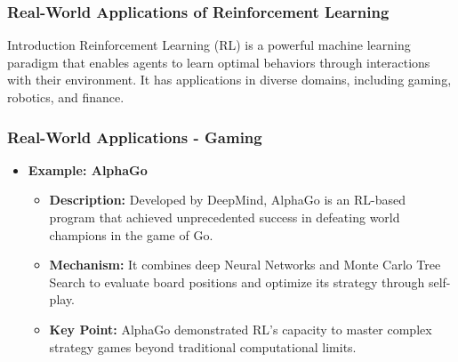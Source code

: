 \documentclass{beamer}
\begin{document}
\begin{frame}[fragile]
    \frametitle{Real-World Applications of Reinforcement Learning}
    \begin{block}{Introduction}
        Reinforcement Learning (RL) is a powerful machine learning paradigm that enables agents to learn optimal behaviors through interactions with their environment. It has applications in diverse domains, including gaming, robotics, and finance.
    \end{block}
\end{frame}

\begin{frame}[fragile]
    \frametitle{Real-World Applications - Gaming}
    \begin{itemize}
        \item \textbf{Example: AlphaGo}
        \begin{itemize}
            \item \textbf{Description:} Developed by DeepMind, AlphaGo is an RL-based program that achieved unprecedented success in defeating world champions in the game of Go.
            \item \textbf{Mechanism:} It combines deep Neural Networks and Monte Carlo Tree Search to evaluate board positions and optimize its strategy through self-play.
            \item \textbf{Key Point:} AlphaGo demonstrated RL's capacity to master complex strategy games beyond traditional computational limits.
        \end{itemize}
    \end{itemize}
\end{frame}
\end{document}
